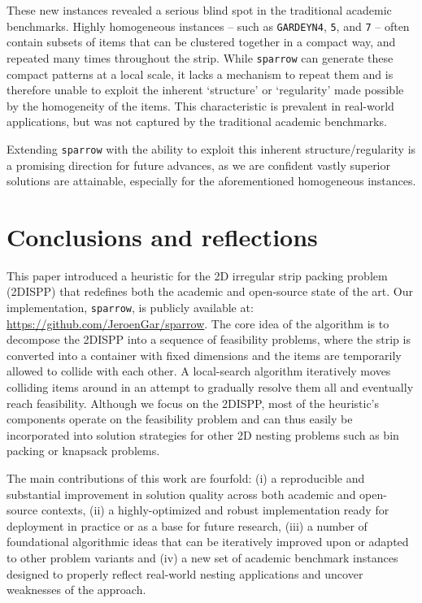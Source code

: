 \documentclass[preprint, 11pt, authoryear]{elsarticle}
\begin{document}
These new instances revealed a serious blind spot in the traditional academic benchmarks.
Highly homogeneous instances -- such as \texttt{GARDEYN4}, \texttt{5}, and \texttt{7} -- often contain subsets of items that can be clustered together in a compact way, and repeated many times throughout the strip.
While \texttt{sparrow} can generate these compact patterns at a local scale, it lacks a mechanism to repeat them and is therefore unable to exploit the inherent `structure' or `regularity' made possible by the homogeneity of the items.
This characteristic is prevalent in real-world applications, but was not captured by the traditional academic benchmarks.

Extending \texttt{sparrow} with the ability to exploit this inherent structure/regularity is a promising direction for future advances, as we are confident vastly superior solutions are attainable, especially for the aforementioned homogeneous instances.

\section{Conclusions and reflections} \label{section:conclusion}
This paper introduced a heuristic for the 2D irregular strip packing problem (2DISPP) that redefines both the academic and open-source state of the art.
Our implementation, \texttt{sparrow}, is publicly available at: \url{https://github.com/JeroenGar/sparrow}.
The core idea of the algorithm is to decompose the 2DISPP into a sequence of feasibility problems, where the strip is converted into a container with fixed dimensions and the items are temporarily allowed to collide with each other.
A local-search algorithm iteratively moves colliding items around in an attempt to gradually resolve them all and eventually reach feasibility.
Although we focus on the 2DISPP, most of the heuristic's components operate on the feasibility problem and can thus easily be incorporated into solution strategies for other 2D nesting problems such as bin packing or knapsack problems.

The main contributions of this work are fourfold: 
(i) a reproducible and substantial improvement in solution quality across both academic and open-source contexts,
(ii) a highly-optimized and robust implementation ready for deployment in practice or as a base for future research,
(iii) a number of foundational algorithmic ideas that can be iteratively improved upon or adapted to other problem variants and
(iv) a new set of academic benchmark instances designed to properly reflect real-world nesting applications and uncover weaknesses of the approach.
\end{document}
